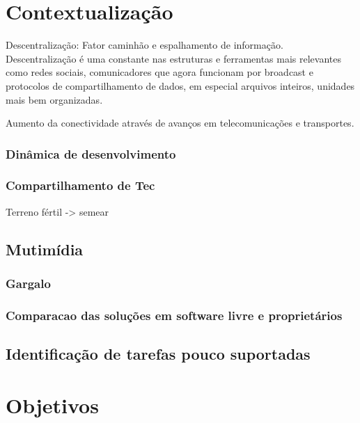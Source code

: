 \section{Contextualização}
\label{sec:context}

Descentralização: Fator caminhão e espalhamento de informação. Descentralização
é uma constante nas estruturas e ferramentas mais relevantes como redes
sociais, comunicadores que agora funcionam por broadcast e protocolos de
compartilhamento de dados, em especial arquivos inteiros, unidades mais
bem organizadas.

Aumento da conectividade através de avanços em telecomunicações e transportes.

\subsubsection{Dinâmica de desenvolvimento}
\label{sec:din_dev}


\subsubsection{Compartilhamento de Tec}
\label{sec:comp_tec}

Terreno fértil -> semear



\subsection{Mutimídia} %
\label{sec:multimidia}

\subsubsection{Gargalo}
\label{sec:gargalo}

\subsubsection{Comparacao das soluções em software livre e proprietários}
\label{sec:sl_prop}

\subsection{Identificação de tarefas pouco suportadas}
\label{sec:tarefas_n_sup}



\section{Objetivos}
\label{sec:objetivos}


